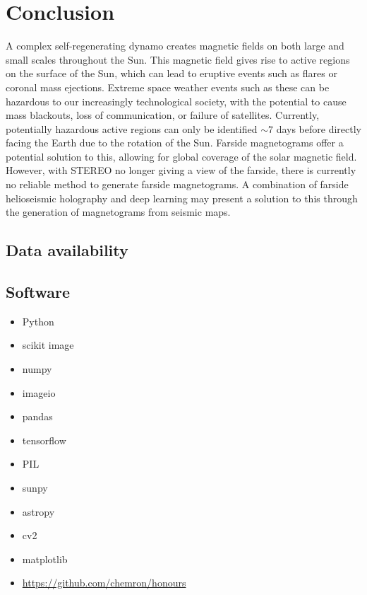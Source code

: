 \documentclass[11pt,a4paper,onecolumn]{report}
\begin{document}
\chapter{Conclusion}
A complex self-regenerating dynamo creates magnetic fields on both large and
small scales throughout the Sun. This magnetic field gives rise to active
regions on the surface of the Sun, which can lead to eruptive events such as
flares or coronal mass ejections. Extreme space weather events such as these can
be hazardous to our increasingly technological society, with the potential to
cause mass blackouts, loss of communication, or failure of satellites.
Currently, potentially hazardous active regions can only be identified \(\sim
7\) days before directly facing the Earth due to the rotation of the Sun.
Farside magnetograms offer a potential solution to this, allowing for global
coverage of the solar magnetic field. However, with STEREO no longer giving a
view of the farside, there is currently no reliable method to generate farside
magnetograms. A combination of farside helioseismic holography and deep learning
may present a solution to this through the generation of magnetograms from
seismic maps.



\section{Data availability}

\section{Software}
\begin{itemize}
  \item Python
  \item scikit image \cite{van_der_walt_scikit-image_2014}
  \item numpy
  \item imageio
  \item pandas
  \item tensorflow
  \item PIL
  \item sunpy
  \item astropy
  \item cv2
  \item matplotlib
  \item \url{https://github.com/chemron/honours}
\end{itemize}



\end{document}
